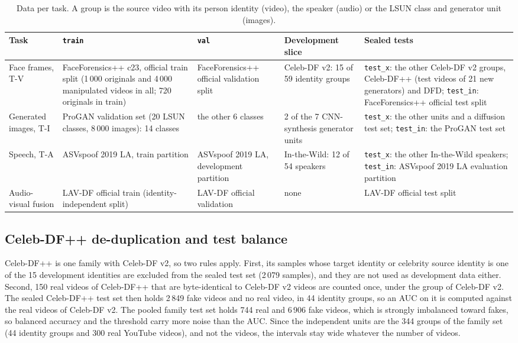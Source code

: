 \documentclass[conference,a4paper]{IEEEtran_nodash}
\newcommand{\spl}[1]{\texttt{#1}}
\begin{document}
\begin{table}[!t]
\centering
\caption[Data per task]{Data per task. A group is the source video with its person identity
(video), the speaker (audio) or the LSUN class and generator unit (images).}
\label{tab:data}
\small
\begin{tabular}{@{}L{1.9cm} L{3.7cm} L{2.9cm} L{3.0cm} L{4.6cm}@{}}
\toprule
Task & \spl{train} & \spl{val} & Development slice & Sealed tests \\
\midrule
Face frames, T-V &
FaceForensics++ c23, official train split (1\,000 originals and 4\,000
manipulated videos in all; 720 originals in train) &
FaceForensics++ official validation split &
Celeb-DF v2: 15 of 59 identity groups &
\spl{test\_x}: the other Celeb-DF v2 groups, Celeb-DF++ (test videos of 21
new generators) and DFD; \spl{test\_in}: FaceForensics++ official test split \\
Generated images, T-I &
ProGAN validation set (20 LSUN classes, 8\,000 images): 14 classes &
the other 6 classes &
2 of the 7 CNN-synthesis generator units &
\spl{test\_x}: the other units and a diffusion test set; \spl{test\_in}: the
ProGAN test set \\
Speech, T-A &
ASVspoof 2019 LA, train partition &
ASVspoof 2019 LA, development partition &
In-the-Wild: 12 of 54 speakers &
\spl{test\_x}: the other In-the-Wild speakers; \spl{test\_in}: ASVspoof 2019 LA
evaluation partition \\
Audio-visual fusion &
LAV-DF official train (identity-independent split) &
LAV-DF official validation &
none &
LAV-DF official test split \\
\bottomrule
\end{tabular}
\end{table}

\subsection{Celeb-DF++ de-duplication and test balance}
Celeb-DF++ is one family with Celeb-DF v2, so two rules apply. First, its
samples whose target identity or celebrity source identity is one of the 15
development identities are excluded from the sealed test set (2\,079 samples),
and they are not used as development data either. Second, 150 real videos of
Celeb-DF++ that are byte-identical to Celeb-DF v2 videos are counted once, under
the group of Celeb-DF v2. The sealed Celeb-DF++ test set then holds 2\,849 fake
videos and no real video, in 44 identity groups, so an AUC on it is computed
against the real videos of Celeb-DF v2. The pooled family test set holds 744
real and 6\,906 fake videos, which is strongly imbalanced toward fakes, so
balanced accuracy and the threshold carry more noise than the AUC. Since the
independent units are the 344 groups of the family set (44 identity groups and
300 real YouTube videos), and not the videos, the intervals stay wide whatever
the number of videos.
\end{document}
